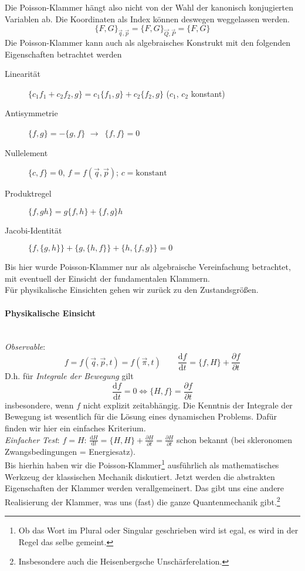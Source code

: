 \documentclass[oneside]{book}
\theoremstyle{definition}
\newcommand{\conseq}{$\rightarrow$~}
\renewcommand{\d}{\mathrm d}
\newcommand{\ddd}[2]{\frac{\d #1}{\d #2}}
\newcommand{\ffpartial}[2]{\frac{\partial #1}{\partial #2}}
\newcommand{\const}{\text{konstant}}
\begin{document}
Die Poisson-Klammer hängt also nicht von der Wahl der kanonisch konjugierten Variablen ab. Die Koordinaten als Index können deswegen weggelassen werden.
$$\{F, G\}_{\vec{q}, \vec{p}} = \{F, G\}_{\vec{Q}, \vec{P}} = \{F, G\}$$
Die Poisson-Klammer kann auch als algebraisches Konstrukt mit den folgenden Eigenschaften betrachtet werden 
\begin{description}
	\item[Linearität] $\{c_1 f_1 + c_2 f_2, g\} = c_1 \{f_1, g\} + c_2 \{f_2, g\}$ ($c_1$, $c_2$ konstant)
	\item[Antisymmetrie] $\{f, g\} = - \{g, f\}$ \conseq $\{f, f\} = 0$
	\item[Nullelement] $\{c, f\} = 0$, $f=f(\vec{q}, \vec{p})$; $c = \const$
	\item[Produktregel] $\{f, g h\} = g \{f, h\} + \{f, g\} h$
	\item[Jacobi-Identität] $\{f, \{g, h\}\} + \{g, \{h, f\}\} + \{h, \{f, g\}\} = 0$
\end{description}

Bis hier wurde Poisson-Klammer nur als algebraische Vereinfachung betrachtet, mit eventuell der Einsicht der fundamentalen Klammern.\\
Für physikalische Einsichten gehen wir zurück zu den Zustandsgrößen.

\paragraph{Physikalische Einsicht}~\\
\textit{Observable}: 
$$f = f(\vec{q}, \vec{p}, t) = f(\vec{\pi}, t) \qquad \ddd{f}{t} = \{f, H\} + \ffpartial{f}{t}$$
D.h. für \textit{Integrale der Bewegung} gilt
$$\ddd{f}{t} = 0 \Leftrightarrow \{H, f\} = \ffpartial{f}{t}$$
insbesondere, wenn $f$ nicht explizit zeitabhängig. Die Kenntnis der Integrale der Bewegung ist wesentlich für die Lösung eines dynamischen Problems. Dafür finden wir hier ein einfaches Kriterium.\\
\textit{Einfacher Test}: $f = H$: $\ddd{H}{t} = \{H, H\} + \ffpartial{H}{t} = \ffpartial{H}{t}$ schon bekannt (bei skleronomen Zwangsbedingungen = Energiesatz).\\
Bis hierhin haben wir die Poisson-Klammer\footnote{Ob das Wort im Plural oder Singular geschrieben wird ist egal, es wird in der Regel das selbe gemeint.} ausführlich als mathematisches Werkzeug der klassischen Mechanik diskutiert.
Jetzt werden die abstrakten Eigenschaften der Klammer werden verallgemeinert.
Das gibt uns eine andere Realisierung der Klammer, was uns (fast) die ganze Quantenmechanik gibt.\footnote{Insbesondere auch die Heisenbergsche Unschärferelation.}
\end{document}
